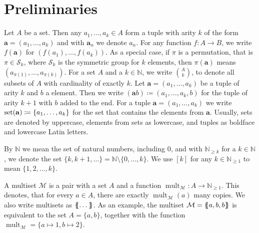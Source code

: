 \section{Preliminaries}
\label{sec:Preliminaries}

Let $A$ be a set.
Then any $a_1,\dots, a_k\in A$ form a tuple with arity $k$ of the form $\mathbf a=(a_1,\dots,a_k)$ and with $\mathbf a_n$ we denote $a_n$.
For any function $f:A\to B$, we write $f(\mathbf a)$ for $(f(a_1),\dots,f(a_k))$.
As a special case, if $\pi$ is a permutation, that is $\pi\in \mathcal S_k$, where $\mathcal S_k$ is the symmetric group for $k$ elements, then $\pi(\mathbf a)$ means $(a_{\pi(1)},\dots,a_{\pi(k)})$.
For a set $A$ and a $k\in \mathbb N$, we write $\binom{A}{k}$, to denote all subsets of $A$ with cardinality of exactly $k$.
Let $\mathbf a=(a_1,\dots,a_k)$ be a tuple of arity $k$ and $b$ a element.
Then we write $(\mathbf ab)\coloneqq(a_1,\dots,a_k,b)$ for the tuple of arity $k+1$ with $b$ added to the end.
For a tuple $\mathbf a=(a_1,\dots,a_k)$ we write $\operatorname{set}(\mathbf a)\coloneqq\{a_1,\dots,a_k\}$ for the set that contains the elements from $\mathbf a$.
Usually, sets are denoted by uppercase, elements from sets as lowercase, and tuples as boldface and lowercase Latin letters.

By $\mathbb N$ we mean the set of natural numbers, including $0$, and with $\mathbb N_{\geq k}$ for a $k\in \mathbb N$, we denote the set $\{k,k+1,\dots\}=\mathbb N \setminus \{0,\dots,k\}$.
We use $[k]$ for any $k\in \mathbb N_{\geq 1}$ to mean $\{1,2,\dots, k\}$.

A multiset $\mathcal M$ is a pair with a set $A$ and a function $\operatorname{mult}_{\mathcal M}:A\to \mathbb N_{\geq 1}$.
This denotes, that for every $a\in A$, there are exactly $\operatorname{mult}_{\mathcal M}(a)$ many copies.
We also write multisets as $\left\{\kern-.35em\left\{\dots\right\}\kern-.35em\right\}$.
As an example, the multiset $\mathcal M = \left\{\kern-.35em\left\{a, b, b\right\}\kern-.35em\right\}$ is equivalent to the set $A=\{a,b\}$, together with the function $\operatorname{mult}_{\mathcal M}=\{a\mapsto 1, b\mapsto 2\}$.


